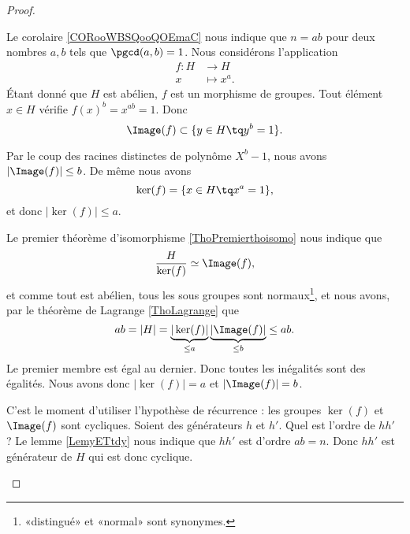 \begin{proof}
\begin{subproof}
\begin{subproof}
			\begin{subproof}
				\spitem[Un morphisme]
				Le corolaire \ref{CORooWBSQooQOEmaC} nous indique que \( n=ab\) pour deux nombres \( a,b\) tels que \( \pgcd(a,b)=1\). Nous considérons l'application
				\begin{equation}
					\begin{aligned}
						f\colon H & \to H        \\
						x         & \mapsto x^a.
					\end{aligned}
				\end{equation}
				Étant donné que \( H\) est abélien, \( f\) est un morphisme de groupes. Tout élément \( x\in H\) vérifie \( f(x)^b=x^{ab}=1\). Donc
				\begin{equation}
					\Image(f)\subset\{ y\in H\tq y^b=1 \}.
				\end{equation}

				Par le coup des racines distinctes de polynôme \( X^b-1\), nous avons \( | \Image(f) |\leq b\). De même nous avons
				\begin{equation}
					\ker(f)=\{ x\in H\tq x^a=1 \},
				\end{equation}
				et donc \( | \ker(f) |\leq a\).

				Le premier théorème d'isomorphisme \ref{ThoPremierthoisomo} nous indique que
				\begin{equation}
					\frac{ H }{ \ker(f) }\simeq \Image(f),
				\end{equation}
				et comme tout est abélien, tous les sous groupes sont normaux\footnote{«distingué» et «normal» sont synonymes.}, et nous avons, par le théorème de Lagrange \ref{ThoLagrange} que
				\begin{equation}
					ab = | H |=\underbrace{| \ker(f) |}_{\leq a}\underbrace{| \Image(f) |}_{\leq b}\leq ab.
				\end{equation}
				Le premier membre est égal au dernier. Donc toutes les inégalités sont des égalités. Nous avons donc \( | \ker(f) |=a\) et \( | \Image(f) |=b\).

				C'est le moment d'utiliser l'hypothèse de récurrence : les groupes \( \ker(f)\) et \( \Image(f)\) sont cycliques. Soient des générateurs \( h\) et \( h'\). Quel est l'ordre de \( hh'\) ? Le lemme \ref{LemyETtdy} nous indique que \( hh'\) est d'ordre \( ab=n\). Donc \( hh'\) est générateur de \( H\) qui est donc cyclique.
			\end{subproof}
		\end{subproof}
	\end{subproof}
\end{proof}

